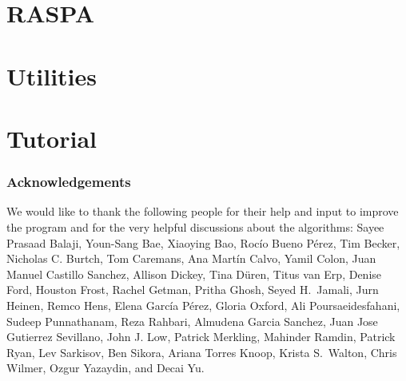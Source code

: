 \documentclass[onecolumn]{book}
\begin{document}
\tableofcontents

\part{RASPA}








\part{Utilities}


\part{Tutorial}




\section*{Acknowledgements}
We would like to thank the following people for their help and input to improve the program and for
the very helpful discussions about the algorithms: Sayee Prasaad Balaji, Youn-Sang Bae, Xiaoying Bao, Roc\'io Bueno P\'erez, Tim Becker,
Nicholas C. Burtch, Tom Caremans, Ana Mart\'in Calvo, Yamil Colon,
Juan Manuel Castillo Sanchez, Allison Dickey, Tina D\"uren, Titus van Erp, Denise Ford,
Houston Frost, Rachel Getman,  Pritha Ghosh, Seyed H.\ Jamali, Jurn Heinen, Remco Hens, Elena Garc\'ia P\'erez, Gloria Oxford, Ali Poursaeidesfahani, Sudeep Punnathanam, 
Reza Rahbari, Almudena Garcia Sanchez, Juan Jose Gutierrez Sevillano,
John J. Low, Patrick Merkling, Mahinder Ramdin,
Patrick Ryan, Lev Sarkisov, Ben Sikora, Ariana Torres Knoop, Krista S.\ Walton, Chris Wilmer, Ozgur Yazaydin, and Decai Yu.
\end{document}

